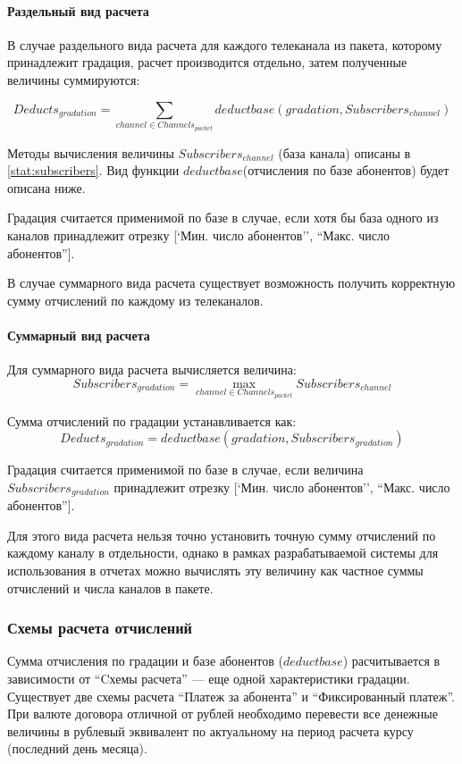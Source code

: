 \paragraph{Раздельный вид расчета}
В случае раздельного вида расчета для каждого телеканала из пакета, которому принадлежит градация,
расчет производится отдельно, затем полученные величины суммируются:

$$Deducts_{gradation} = \sum_{channel \in Channels_{packet}} deductbase(gradation, Subscribers_{channel})$$

Методы вычисления величины $Subscribers_{channel}$ (база канала) описаны в \ref{stat:subscribers}.
Вид функции $deductbase$(отчисления по базе абонентов) будет описана ниже. 

Градация считается применимой по базе в случае, если хотя бы база одного из каналов принадлежит отрезку 
[`Мин. число абонентов'', ``Макс. число абонентов''].

В случае суммарного вида расчета существует возможность получить корректную сумму отчислений по каждому из 
телеканалов.

\paragraph{Суммарный вид расчета}
Для суммарного вида расчета вычисляется величина:
$$Subscribers_{gradation} = \max\limits_{channel \in Channels_{packet}} Subscribers_{channel}$$

Сумма отчислений по градации устанавливается как:
$$Deducts_{gradation} = deductbase(gradation, Subscribers_{gradation})$$

Градация считается применимой по базе в случае, если величина $Subscribers_{gradation}$ принадлежит отрезку 
[`Мин. число абонентов'', ``Макс. число абонентов''].

Для этого вида расчета нельзя точно установить точную сумму отчислений по каждому каналу в отдельности,
однако в рамках разрабатываемой системы для использования в отчетах можно вычислять эту величину как частное 
суммы отчислений и числа каналов в пакете.

\subsubsection{Схемы расчета отчислений}
Сумма отчисления по градации и базе абонентов ($deductbase$) расчитывается в зависимости от 
``Cхемы расчета'' --- еще одной характеристики градации. Существует две схемы расчета ``Платеж за абонента''
и ``Фиксированный платеж''. При валюте договора отличной от рублей необходимо перевести все денежные величины
в рублевый эквивалент по актуальному на период расчета курсу (последний день месяца).

